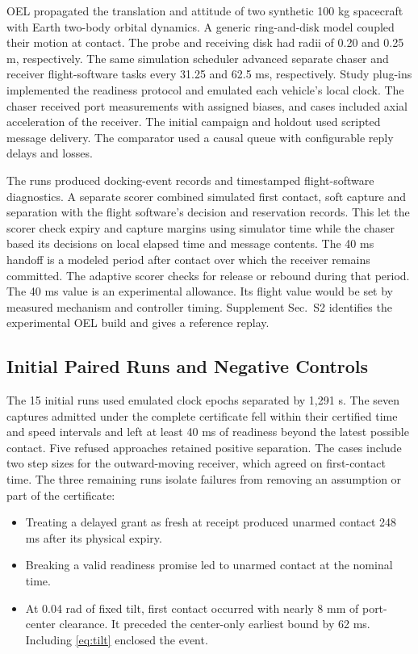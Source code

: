 \documentclass{IEEEtaes}
\begin{document}
OEL propagated the translation and attitude of two synthetic 100 kg spacecraft with Earth two-body orbital dynamics. A generic ring-and-disk model coupled their motion at contact. The probe and receiving disk had radii of 0.20 and 0.25 m, respectively. The same simulation scheduler advanced separate chaser and receiver flight-software tasks every 31.25 and 62.5 ms, respectively. Study plug-ins implemented the readiness protocol and emulated each vehicle's local clock. The chaser received port measurements with assigned biases, and cases included axial acceleration of the receiver. The initial campaign and holdout used scripted message delivery. The comparator used a causal queue with configurable reply delays and losses.

The runs produced docking-event records and timestamped flight-software diagnostics. A separate scorer combined simulated first contact, soft capture and separation with the flight software's decision and reservation records. This let the scorer check expiry and capture margins using simulator time while the chaser based its decisions on local elapsed time and message contents. The 40 ms handoff is a modeled period after contact over which the receiver remains committed. The adaptive scorer checks for release or rebound during that period. The 40 ms value is an experimental allowance. Its flight value would be set by measured mechanism and controller timing. Supplement Sec.~S2 identifies the experimental OEL build and gives a reference replay.

\subsection{Initial Paired Runs and Negative Controls}

The 15 initial runs used emulated clock epochs separated by 1,291 s. The seven captures admitted under the complete certificate fell within their certified time and speed intervals and left at least 40 ms of readiness beyond the latest possible contact. Five refused approaches retained positive separation. The cases include two step sizes for the outward-moving receiver, which agreed on first-contact time. The three remaining runs isolate failures from removing an assumption or part of the certificate:
\begin{itemize}
\item Treating a delayed grant as fresh at receipt produced unarmed contact 248 ms after its physical expiry.
\item Breaking a valid readiness promise led to unarmed contact at the nominal time.
\item At 0.04 rad of fixed tilt, first contact occurred with nearly 8 mm of port-center clearance. It preceded the center-only earliest bound by 62 ms. Including \eqref{eq:tilt} enclosed the event.
\end{itemize}
\end{document}
